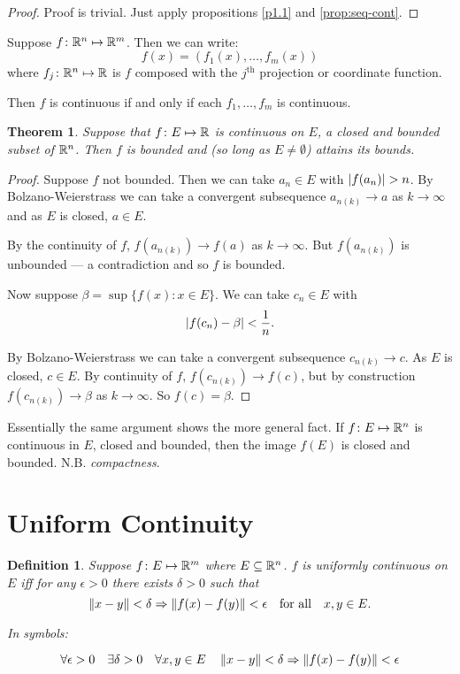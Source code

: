 \documentclass{notes}
\theoremstyle{plain}
\newtheorem{theorem}[proposition]{Theorem}
\newtheorem{definition}[proposition]{Definition}
\newcommand{\Forall}[1]{\forall #1 \quad}
\newcommand{\Exists}[1]{\exists #1 \quad}
\begin{document}
\begin{proof}
Proof is trivial. Just apply propositions \ref{p1.1} and \ref{prop:seq-cont}.
\end{proof}

Suppose $ f\colon  \mathbb{R}^{n} \mapsto \mathbb{R}^{m} $. Then we can write:
\[ f(x) = (f_{1}(x),\ldots,f_{m}(x)) \] where 
$f_{j}\colon \mathbb{R}^{n} \mapsto \mathbb{R}$
is $ f $ composed with the $ j^{\text{th}} $ projection 
or coordinate function.

Then $ f $ is continuous if and only if each $ f_{1}, \ldots, 
f_{m}  $ is continuous.

\begin{theorem}
Suppose that $ f\colon  E \mapsto \mathbb{R} $ is continuous on $ E $, a
closed and bounded subset of $ \mathbb{R}^{n} $. Then $ f $ is bounded and (so 
long as $ E \neq \emptyset $) attains its bounds.
\end{theorem}

\begin{proof}
Suppose $ f $ not bounded. Then we can take $ a_{n} \in E $ with 
$\abs{f(a_{n})}>n$.  By Bolzano-Weierstrass we can take a convergent 
subsequence $ a_{n(k)} \to a $ as $ k \to \infty $ and as $ E $ is
closed, $ a \in E $.

By the continuity of $ f $, $f(a_{n(k)}) \to f(a)$ as $ k 
\to \infty $. But $f(a_{n(k)})$ is unbounded --- a 
contradiction and so $f$ is bounded.

Now suppose $\beta = \sup \{ f(x)\colon  x \in E \}$.  We can take
$ c_{n} \in E $ with \[ \left|f(c_{n})-\beta\right|<\frac{1}{n}. \]

By Bolzano-Weierstrass we can take a convergent subsequence $ c_{n(k)} 
\to c $. As $ E $ is closed, $ c \in E $.
By continuity of $ f $, $ f(c_{n(k)}) \to f(c) $, but by 
construction $f(c_{n(k)}) \to \beta$ as $ k \to 
\infty $. So $ f(c) = \beta $.
\end{proof}

Essentially the same argument shows the more general fact. 
If $ f\colon E \mapsto \mathbb{R}^{n} $ is continuous in $ E $, closed and 
bounded, then the image $ f(E) $ is closed and bounded. N.B. 
\emph{compactness}.

\section{Uniform Continuity}

\begin{definition}
Suppose $ f\colon E \mapsto \mathbb{R}^{m} $ where $ E \subseteq \mathbb{R}^{n} $.
$ f $ is \emph{uniformly continuous} on $ E $ iff 
for any $ \epsilon>0 $ there exists $ \delta>0 $ such that
\[
\left\|x-y\right\|<\delta \Rightarrow \left\|f(x)-f(y)\right\|< \epsilon \quad 
\text{for all} \quad x,y \in E. \]

In symbols:

\[ \Forall{\epsilon>0} \Exists{\delta>0} \Forall{x,y \in E} \norm{x-y}< 
\delta \Rightarrow \norm{f(x)-f(y)}<\epsilon \]
\end{definition}
\end{document}
